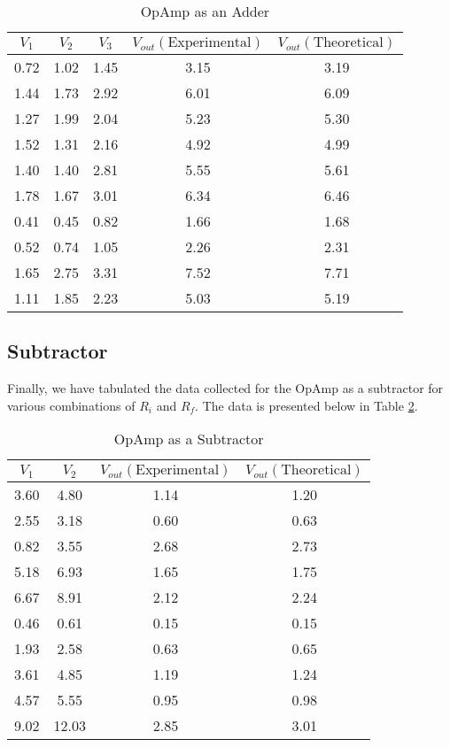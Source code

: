 \documentclass[12pt]{article}
\begin{document}
\begin{table}[H]
    \centering
    \begin{tabular}{|c|c|c|c|c|}
        \hline
        $V_1$ & $V_2$ & $V_3$ & $V_{out}(\text{Experimental})$ & $V_{out}(\text{Theoretical})$  \\
        \hline
        0.72 & 1.02 & 1.45 & 3.15 & 3.19 \\
        1.44 & 1.73 & 2.92 & 6.01 & 6.09 \\
        1.27 & 1.99 & 2.04 & 5.23 & 5.30 \\
        1.52 & 1.31 & 2.16 & 4.92 & 4.99 \\
        1.40 & 1.40 & 2.81 & 5.55 & 5.61 \\
        1.78 & 1.67 & 3.01 & 6.34 & 6.46 \\
        0.41 & 0.45 & 0.82 & 1.66 & 1.68 \\
        0.52 & 0.74 & 1.05 & 2.26 & 2.31 \\
        1.65 & 2.75 & 3.31 & 7.52 & 7.71 \\
        1.11 & 1.85 & 2.23 & 5.03 & 5.19 \\
        \hline
    \end{tabular}
    \caption{OpAmp as an Adder}
    \label{tab:voltage_data_adder}
\end{table}


\subsection*{Subtractor}
Finally, we have tabulated the data collected for the OpAmp as a subtractor for various combinations of $R_i$ and $R_f$. The data is presented below in Table \ref{tab:voltage_data2}.

\begin{table}[H]
  \centering
  \begin{tabular}{|c|c|c|c|}
      \hline
      $V_1$ & $V_2$ & $V_{out}(\text{Experimental})$ & $V_{out}(\text{Theoretical})$ \\
      \hline
      3.60 & 4.80  & 1.14  & 1.20 \\
      2.55 & 3.18  & 0.60  & 0.63 \\
      0.82 & 3.55  & 2.68  & 2.73 \\
      5.18 & 6.93  & 1.65  & 1.75 \\
      6.67 & 8.91  & 2.12  & 2.24 \\
      0.46 & 0.61  & 0.15  & 0.15 \\
      1.93 & 2.58  & 0.63  & 0.65 \\
      3.61 & 4.85  & 1.19  & 1.24 \\
      4.57 & 5.55  & 0.95  & 0.98 \\
      9.02 & 12.03 & 2.85  & 3.01 \\
      \hline
  \end{tabular}
  \caption{OpAmp as a Subtractor}
  \label{tab:voltage_data2}
\end{table}
\end{document}
